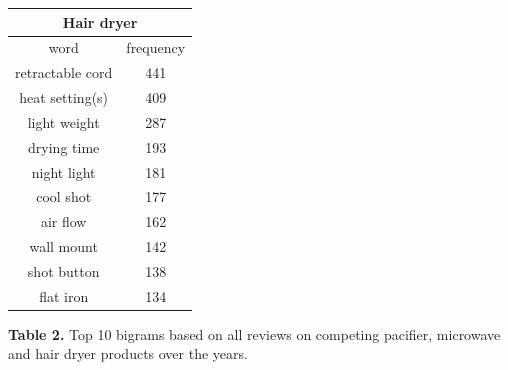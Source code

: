 \documentclass[reqno]{article}
\theoremstyle{definition}
\theoremstyle{definition}
\theoremstyle{remark}
\begin{document}
\begin{center}
\begin{tabular}{|c|c|} 
 \hline
 \multicolumn{2}{|c|}{Hair dryer} \\
 \hline
 word & frequency \\ 
 \hline
retractable cord    &   441\\
heat        setting(s) &  409\\
light       weight   &  287\\
 drying      time    &   193\\
 night       light   &   181\\
 cool        shot    &   177\\
 air         flow    &   162\\
wall        mount   &   142\\
shot        button   &  138\\
flat        iron     &  134\\
 \hline
\end{tabular}
\bigskip
\par
    \textbf{Table 2.} Top 10 bigrams based on all reviews on competing pacifier, microwave and hair dryer products over the years.
\end{center}
\end{document}
